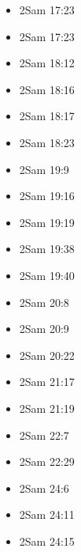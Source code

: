 \documentclass[14pt]{book}
\begin{document}
\begin{multicols}{2}
\begin{itemize}
							\item 2Sam 17:23
							
							\item 2Sam 17:23
							
							\item 2Sam 18:12
							
							\item 2Sam 18:16
							
							\item 2Sam 18:17
							
							\item 2Sam 18:23
							
							\item 2Sam 19:9
							
							\item 2Sam 19:16
							
							\item 2Sam 19:19
							
							\item 2Sam 19:38
							
							\item 2Sam 19:40
							
							\item 2Sam 20:8
							
							\item 2Sam 20:9
							
							\item 2Sam 20:22
							
							\item 2Sam 21:17
							
							\item 2Sam 21:19
							
							\item 2Sam 22:7
							
							\item 2Sam 22:29
							
							\item 2Sam 24:6
							
							\item 2Sam 24:11
							
							\item 2Sam 24:15
							
										\end{itemize}\end{multicols}
						
\end{document}
